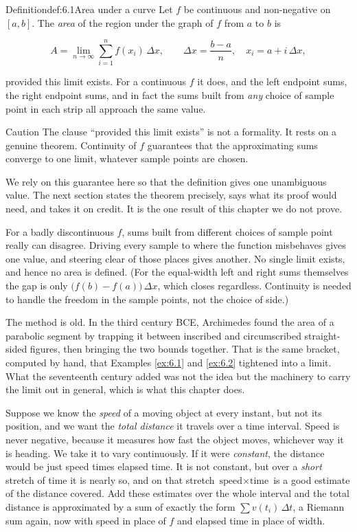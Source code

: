 \documentclass[a4paper,12pt,oneside]{memoir}
\begin{document}
\begin{envdefinition}{Definition}{def:6.1}{Area under a curve}
Let \(f\) be continuous and non-negative on \([a, b]\). The \emph{area} of the region under the graph of \(f\) from \(a\) to \(b\) is

\[ A = \lim_{n \to \infty} \sum_{i=1}^{n} f(x_{i})\,\Delta x, \qquad \Delta x = \frac{b - a}{n},\quad x_{i} = a + i\,\Delta x, \]

provided this limit exists. For a continuous \(f\) it does, and the left endpoint sums, the right endpoint sums, and in fact the sums built from \emph{any} choice of sample point in each strip all approach the same value.
\end{envdefinition}
\begin{envcaution}{Caution}{}{}
The clause “provided this limit exists” is not a formality. It rests on a genuine theorem. Continuity of \(f\) guarantees that the approximating sums converge to one limit, whatever sample points are chosen.

We rely on this guarantee here so that the definition gives one unambiguous value. The next section states the theorem precisely, says what its proof would need, and takes it on credit. It is the one result of this chapter we do not prove.

For a badly discontinuous \(f\), sums built from different choices of sample point really can disagree. Driving every sample to where the function misbehaves gives one value, and steering clear of those places gives another. No single limit exists, and hence no area is defined. (For the equal-width left and right sums themselves the gap is only \(\bigl(f(b) - f(a)\bigr)\,\Delta x\), which closes regardless. Continuity is needed to handle the freedom in the sample points, not the choice of side.)
\end{envcaution}
The method is old. In the third century BCE, Archimedes found the area of a parabolic segment by trapping it between inscribed and circumscribed straight-sided figures, then bringing the two bounds together. That is the same bracket, computed by hand, that Examples \ref{ex:6.1} and \ref{ex:6.2} tightened into a limit. What the seventeenth century added was not the idea but the machinery to carry the limit out in general, which is what this chapter does.

Suppose we know the \emph{speed} of a moving object at every instant, but not its position, and we want the \emph{total distance} it travels over a time interval. Speed is never negative, because it measures how fast the object moves, whichever way it is heading. We take it to vary continuously. If it were \emph{constant}, the distance would be just speed times elapsed time. It is not constant, but over a \emph{short} stretch of time it is nearly so, and on that stretch \(\text{speed} \times \text{time}\) is a good estimate of the distance covered. Add these estimates over the whole interval and the total distance is approximated by a sum of exactly the form \(\sum v(t_{i})\,\Delta t\), a Riemann sum again, now with speed in place of \(f\) and elapsed time in place of width.
\end{document}

